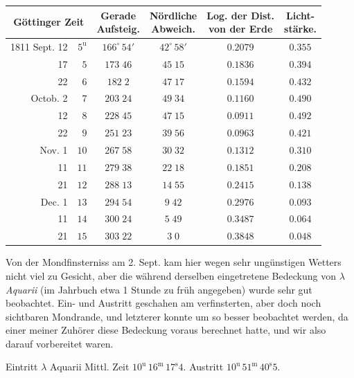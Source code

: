 \begin{center}\fontsize{10}{12}\selectfont\setlength{\tabcolsep}{4pt}\renewcommand{\arraystretch}{1.15}\begin{tabular}{rr|c|c|c|c}
\multicolumn{2}{c|}{Göttinger Zeit} & \shortstack{Gerade\\Aufsteig.} & \shortstack{Nördliche\\Abweich.} & \shortstack{Log. der Dist.\\von der Erde} & \shortstack{Licht-\\stärke.}\\
\hline
1811 Sept. 12 & $5^{\mathrm u}$ & $166^\circ\,54'$ & $42^\circ\,58'$ & $0.2079$ & $0.355$\\
17 & $5$ & $173\;46$ & $45\;15$ & $0.1836$ & $0.394$\\
22 & $6$ & $182\;2$ & $47\;17$ & $0.1594$ & $0.432$\\
Octob. 2 & $7$ & $203\;24$ & $49\;34$ & $0.1160$ & $0.490$\\
12 & $8$ & $228\;45$ & $47\;15$ & $0.0911$ & $0.492$\\
22 & $9$ & $251\;23$ & $39\;56$ & $0.0963$ & $0.421$\\
Nov. 1 & $10$ & $267\;58$ & $30\;32$ & $0.1312$ & $0.310$\\
11 & $11$ & $279\;38$ & $22\;18$ & $0.1851$ & $0.208$\\
21 & $12$ & $288\;13$ & $14\;55$ & $0.2415$ & $0.138$\\
Dec. 1 & $13$ & $294\;54$ & $9\;42$ & $0.2976$ & $0.093$\\
11 & $14$ & $300\;24$ & $5\;49$ & $0.3487$ & $0.064$\\
21 & $15$ & $303\;22$ & $3\;0$ & $0.3848$ & $0.048$\\
\end{tabular}\end{center}

\par\indent Von der Mondfinsterniss am 2. Sept. kam hier wegen sehr ungünstigen Wetters nicht viel zu Gesicht, aber die während derselben eingetretene Bedeckung von $\lambda$ \emph{Aquarii} (im Jahrbuch etwa 1 Stunde zu früh angegeben) wurde sehr gut beobachtet. Ein- und Austritt geschahen am verfinsterten, aber doch noch sichtbaren Mondrande, und letzterer konnte um so besser beobachtet werden, da einer meiner Zuhörer diese Bedeckung voraus berechnet hatte, und wir also darauf vorbereitet waren.

\par\indent Eintritt $\lambda$ Aquarii Mittl. Zeit $10^{\mathrm u}\,16^{\mathrm m}\,17^{\mathrm s}4$. Austritt $10^{\mathrm u}\,51^{\mathrm m}\,40^{\mathrm s}5$.

